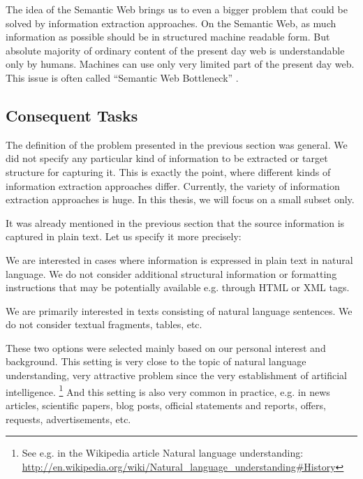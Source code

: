 The idea of the Semantic Web \citep{biblio:2001-Berners-Lee-SemanticWeb} brings us to even a bigger problem that could be solved by information extraction approaches. On the Semantic Web, as much information as possible should be in structured machine readable form. But absolute majority of ordinary content of the present day web is understandable only by humans. Machines can use only very limited part of the present day web. This issue is often called “Semantic Web Bottleneck” \citep{Konstantinou2010}.

\subsection{Consequent Tasks}

The definition of the problem presented in the previous section was general. We did not specify any particular kind of information to be extracted or target structure for capturing it. This is exactly the point, where different kinds of information extraction approaches differ. Currently, the variety of information extraction approaches is huge. In this thesis, we will focus on a small subset only. 

It was already mentioned in the previous section that the source information is captured in plain text. Let us specify it more precisely: 

We are interested in cases where information is expressed in plain text in natural language. We do not consider additional structural information or formatting instructions that may be potentially available e.g. through HTML or XML tags. 

We are primarily interested in texts consisting of natural language sentences. We do not consider textual fragments, tables, etc.

These two options were selected mainly based on our personal interest and background. This setting is very close to the topic of natural language understanding, very attractive problem since the very establishment of artificial intelligence. 
\footnote{See e.g. in the Wikipedia article Natural language understanding: \url{http://en.wikipedia.org/wiki/Natural_language_understanding#History}}
And this setting is also very common in practice, e.g. in news articles, scientific papers, blog posts, official statements and reports, offers, requests, advertisements, etc. 



